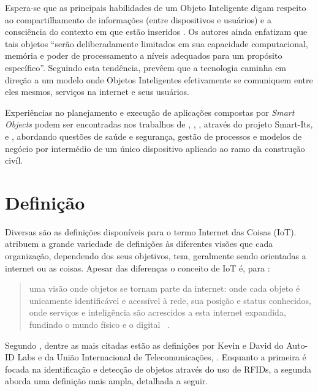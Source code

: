 \documentclass[twoside,english,brazilian]{UNISINOSmonografia}
\begin{document}
	Espera-se que as principais habilidades de um Objeto Inteligente digam 
	respeito ao compartilhamento de informações (entre dispositivos e 
	usuários) e a consciência do contexto em que estão inseridos 
	\cite{Gellersen2001}. 
	Os autores ainda enfatizam que tais objetos ``serão deliberadamente 
	limitados em sua capacidade computacional, memória e poder de 
	processamento a níveis adequados para um propósito específico''. 
	Seguindo esta tendência,  prevêem que a tecnologia 
	caminha em direção a um modelo onde Objetos Inteligentes efetivamente se 
	comuniquem entre eles mesmos, serviços na internet e seus usuários.
	
	Experiências no planejamento e execução de aplicações compostas por 
	\textit{Smart Objects} podem ser encontradas nos trabalhos de 
	, , 
	, através do projeto Smart-Its, e 
	, abordando questões de saúde e segurança, gestão 
	de processos e modelos de negócio por intermédio de um único dispositivo 
	aplicado ao ramo da construção civíl.

\section{Definição}

	Diversas são as definições disponíveis para o termo Internet das 
	Coisas (IoT).  atribuem a grande variedade de 
	definições às diferentes visões que cada organização, dependendo dos 
	seus objetivos, tem, geralmente sendo orientadas a internet ou as 
	coisas. Apesar das diferenças o conceito de IoT é, para 
	:
	
	\begin{quote}
		uma visão onde objetos se tornam parte da internet: onde cada 
		objeto é unicamente identificável e acessível à rede, sua posição 
		e status conhecidos, onde serviços e inteligência são acrescidos a 
		esta internet expandida, fundindo o mundo físico e o digital~
		\cite{Coetzee2011}.
	\end{quote}
	
	Segundo , dentre as mais citadas estão as 
	definições por Kevin  e David 
	 do Auto-ID Labs e da União Internacional de 
	Telecomunicações, . Enquanto a primeira é focada na 
	identificação e detecção de objetos através do uso de RFIDs, a segunda 
	aborda uma definição mais ampla, detalhada a seguir.
	
\end{document}
